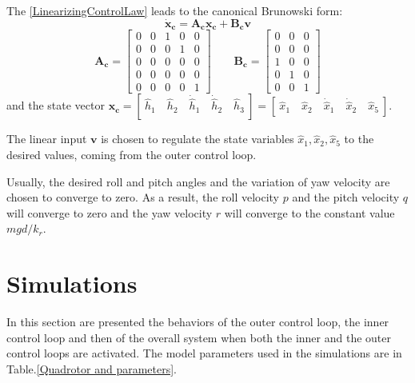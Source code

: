 \documentclass[11pt,a4paper]{scrartcl}
\begin{document}
The \eqref{LinearizingControlLaw} leads to the canonical Brunowski form:
\begin{equation}
	\mathbf{\dot{x}_c = A_c x_c + B_c v}
\end{equation}
\renewcommand{\arraystretch}{1}
\begin{equation}
	\mathbf{A_c} = 
	\begin{bmatrix}
	0 & 0 & 1 & 0 & 0 \\
	0 & 0 & 0 & 1 & 0 \\
	0 & 0 & 0 & 0 & 0 \\
	0 & 0 & 0 & 0 & 0 \\
	0 & 0 & 0 & 0 & 1	
	\end{bmatrix} \qquad
	\mathbf{B_c} = 
	\begin{bmatrix}
	0 & 0 & 0 \\
	0 & 0 & 0 \\
	1 & 0 & 0 \\
	0 & 1 & 0 \\
	0 & 0 & 1
	\end{bmatrix}
\end{equation}
and the state vector $ \mathbf{x_c} = [ \ \hat{h}_1 \quad \hat{h}_2 \quad \dot{\hat{h}}_1 \quad \dot{\hat{h}}_2 \quad \hat{h}_3 \ ] = [ \ \hat{x}_1 \quad \hat{x}_2 \quad \dot{\hat{x}}_1 \quad \dot{\hat{x}}_2 \quad \hat{x}_5 \ ] $.

The linear input $ \mathbf{v} $ is chosen to regulate the state variables $ \hat{x}_1, \hat{x}_2, \hat{x}_5 $ to the desired values, coming from the outer control loop.

Usually, the desired roll and pitch angles and the variation of yaw velocity are chosen to converge to zero. As a result, the roll velocity $ p $ and the pitch velocity $ q $ will converge to zero and the yaw velocity $ r $ will converge to the constant value $ mgd / k_r $. 

\section{Simulations}

In this section are presented the behaviors of the outer control loop, the inner control loop and then of the overall system when both the inner and the outer control loops are activated. The model parameters used in the simulations are in Table.\ref{Quadrotor and parameters}.
\end{document}
